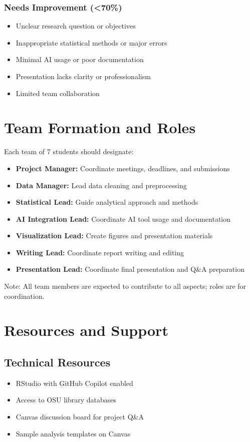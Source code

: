 \documentclass[11pt]{article}
\begin{document}
\subsubsection{Needs Improvement (<70\%)}
\begin{itemize}
\item Unclear research question or objectives
\item Inappropriate statistical methods or major errors
\item Minimal AI usage or poor documentation
\item Presentation lacks clarity or professionalism
\item Limited team collaboration
\end{itemize}

\section{Team Formation and Roles}

Each team of 7 students should designate:
\begin{itemize}
\item \textbf{Project Manager:} Coordinate meetings, deadlines, and submissions
\item \textbf{Data Manager:} Lead data cleaning and preprocessing
\item \textbf{Statistical Lead:} Guide analytical approach and methods
\item \textbf{AI Integration Lead:} Coordinate AI tool usage and documentation
\item \textbf{Visualization Lead:} Create figures and presentation materials
\item \textbf{Writing Lead:} Coordinate report writing and editing
\item \textbf{Presentation Lead:} Coordinate final presentation and Q\&A preparation
\end{itemize}

Note: All team members are expected to contribute to all aspects; roles are for coordination.

\section{Resources and Support}

\subsection{Technical Resources}
\begin{itemize}
\item RStudio with GitHub Copilot enabled
\item Access to OSU library databases
\item Canvas discussion board for project Q\&A
\item Sample analysis templates on Canvas
\end{itemize}
\end{document}
